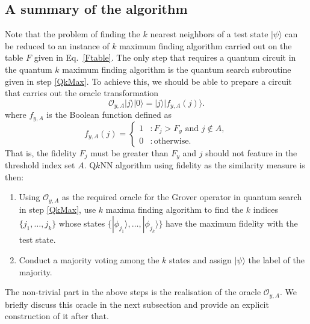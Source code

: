 \documentclass[a4paper,twocolumn,11pt,unpublished]{quantumarticle}
\newcommand{\rang}{\rangle}
\begin{document}
    \subsection{A summary of the algorithm}
    Note that the problem of finding the $k$ nearest neighbors of a test state $|\psi\rang$ can be reduced to an instance of $k$ maximum finding algorithm carried out on the table $F$ given in Eq.~\eqref{Ftable}. The only step that requires a quantum circuit in the quantum $k$ maximum finding algorithm is the quantum search subroutine given in step \ref{QkMax}. To achieve this, we should be able to prepare a circuit that carries out the oracle transformation 
    \begin{equation}\label{OracleOFid}
            \mathcal O_{y,A} |j\rang |0\rang = |j\rang |f_{y,A}(j) \rang.
        \end{equation}
    where $f_{y,A}$ is the Boolean function defined as 
        \begin{equation}\label{eq:fya}
            f_{y,A}(j) = 
            \begin{cases}
                    1 &: F_j>F_y \text{ and } j \notin A,\\
                    0 &: \text{otherwise}.
            \end{cases}
        \end{equation}
        That is, the fidelity $F_j$ must be greater than $F_y$ and $j$ should not feature in the threshold index set $A$. Q$k$NN algorithm using fidelity as the similarity measure is then:
        \begin{enumerate}
            \item
            Using $\mathcal O_{y,A}$ as the required oracle for the Grover operator in quantum search in step \ref{QkMax}, use $k$ maxima finding algorithm to find the $k$ indices $\{j_1, \dots ,j_k\}$ whose states $\{|\phi_{j_1}\rang, \dots ,|\phi_{j_k}\rang\}$  have the maximum fidelity with the test state. 
        
            \item
            Conduct a majority voting among the $k$ states and assign $|\psi\rang$ the label of the majority.     
        \end{enumerate}
    The non-trivial part in the above steps is the realisation of the oracle $\mathcal O_{y,A}$. We briefly discuss this oracle in the next subsection and provide an explicit construction of it after that.
    
\end{document}
